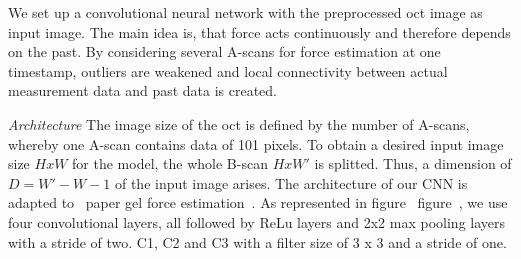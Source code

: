 

We set up a convolutional neural network with the preprocessed oct image as input image.
The main idea is, that force acts continuously and therefore depends on the past.
By considering several A-scans for force estimation at one timestamp, outliers are weakened and local connectivity between actual
measurement data and past data is created.

    \textit{Architecture} The image size of the oct is defined by the number of A-scans, whereby one A-scan contains data of 101 pixels.
To obtain a desired input image size $HxW$ for the model, the whole B-scan $HxW'$ is splitted.
Thus, a dimension of $D = W' - W - 1$ of the input image arises.
The architecture of our CNN is adapted to ~paper gel force estimation~.
As represented in figure ~figure~, we use four convolutional layers, all followed by ReLu layers and 2x2 max pooling layers with a stride of two. 
C1, C2 and C3 with a filter size of 3 x 3 and a stride of one.


